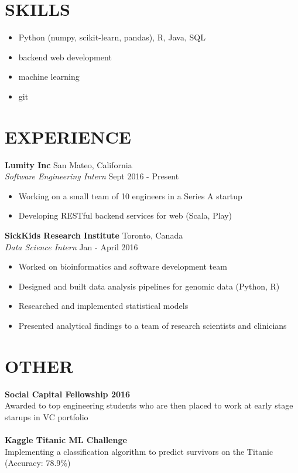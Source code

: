 \documentclass[line, margin, 11pt]{res}
\begin{document}
\address{4A Engineering \\ https://github.com/michael-3 \\ hth.michael@gmail.com}
 

\begin{resume}

\section{SKILLS} 
\renewcommand\labelitemi{\tiny$\bullet$}
\begin{itemize}[leftmargin=10pt]
\item Python (numpy, scikit-learn, pandas), R, Java, SQL
\item backend web development
\item machine learning
\item git
\end{itemize} 

\section{EXPERIENCE} 
\textbf{Lumity Inc} \hfill San Mateo, California \\
\textit{Software Engineering Intern} \hfill Sept 2016 - Present 
\renewcommand\labelitemi{\tiny$\bullet$}
\begin{itemize}[leftmargin=10pt]
\item Working on a small team of 10 engineers in a Series A startup
\item Developing RESTful backend services for web (Scala, Play)
\end{itemize} 
\textbf{SickKids Research Institute} \hfill Toronto, Canada \\
\textit{Data Science Intern} \hfill Jan - April 2016 
\renewcommand\labelitemi{\tiny$\bullet$}
\begin{itemize}[leftmargin=10pt]
\item Worked on bioinformatics and software development team
\item Designed and built data analysis pipelines for genomic data (Python, R)
\item Researched and implemented statistical models 
\item Presented analytical findings to a team of research scientists and clinicians 
\end{itemize} 

\section{OTHER} 
\textbf{Social Capital Fellowship 2016} \\
Awarded to top engineering students who are then placed to work at early stage starups in VC portfolio \\
\\
\textbf{Kaggle Titanic ML Challenge} \\
Implementing a classification algorithm to predict survivors on the Titanic \\
(Accuracy: 78.9\%)


\end{resume}
\end{document}
